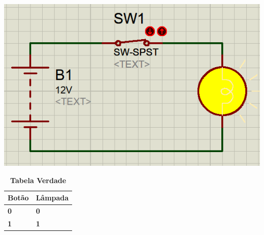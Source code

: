 \begin{multicols}{2}
\vfill
\columnbreak

\begin{center}
	\includegraphics[width=.9\linewidth]{./IMG/Screenshot_20231216_191027.png}
\end{center}
\end{multicols}



\begin{table}[h]
	\centering
	\Large
	\caption{\textbf{Tabela Verdade}}
	\begin{tabular}{|>{\centering\arraybackslash}p{}|>{\centering\arraybackslash}p{}|}
		\hline
		\textbf{Botão} & \textbf{Lâmpada} \\
		\hline
		\textbf{0} & \textbf{0} \\
		\hline
			\textbf{1} & \textbf{1} \\
		\hline
	\end{tabular}
\end{table}




\vfill
\pagebreak

